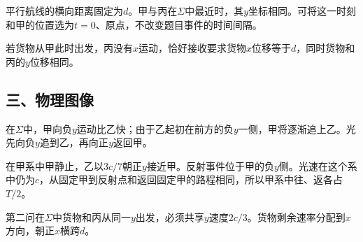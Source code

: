 \documentclass[12pt,a4paper,fontset=fandol]{ctexart}
\begin{document}
平行航线的横向距离固定为\(d\)。甲与丙在\(\Sigma\)中最近时，其\(y\)坐标相同。可将这一时刻和甲的位置选为\(t=0\)、原点，不改变题目事件的时间间隔。

若货物从甲此时出发，丙没有\(x\)运动，恰好接收要求货物\(x\)位移等于\(d\)，同时货物和丙的\(y\)位移相同。

\subsection{三、物理图像}\label{ux4e09ux7269ux7406ux56feux50cf-4}

在\(\Sigma\)中，甲向负\(y\)运动比乙快；由于乙起初在前方的负\(y\)一侧，甲将逐渐追上乙。光先向负\(y\)追到乙，再向正\(y\)返回甲。

\begin{center}
\begin{minipage}{\linewidth}
\centering\begingroup{}
\ifdim\wd\diagrambox>.88\linewidth
\sbox{\diagrambox}{\resizebox{.88\linewidth}{!}{\usebox{\diagrambox}}}\fi
\ifdim\ht\diagrambox>.38\textheight
\resizebox{!}{.38\textheight}{\usebox{\diagrambox}}
\else\usebox{\diagrambox}\fi
\par{}\endgroup\end{minipage}\end{center}

在甲系中甲静止，乙以\(3c/7\)朝正\(y\)接近甲。反射事件位于甲的负\(y\)侧。光速在这个系中仍为\(c\)，从固定甲到反射点和返回固定甲的路程相同，所以甲系中往、返各占\(T/2\)。

第二问在\(\Sigma\)中货物和丙从同一\(y\)出发，必须共享\(y\)速度\(2c/3\)。货物剩余速率分配到\(x\)方向，朝正\(x\)横跨\(d\)。
\end{document}
